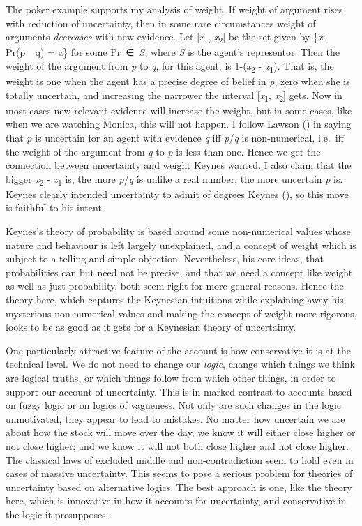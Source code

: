\documentclass[
  10pt,
  letterpaper,
  DIV=11,
  numbers=noendperiod,
  twoside]{scrartcl}
\begin{document}
The poker example supports my analysis of weight. If weight of argument
rises with reduction of uncertainty, then in some rare circumstances
weight of arguments \emph{decreases} with new evidence. Let
{[}\emph{x}\textsubscript{1}, \emph{x}\textsubscript{2}{]} be the set
given by \{\emph{x}: Pr(p\emph{~\textbar~}q) = \emph{x}\} for some
Pr~∈~\emph{S}, where \emph{S} is the agent's representor. Then the
weight of the argument from \emph{p} to \emph{q}, for this agent, is
1-(\emph{x}\textsubscript{2} - \emph{x}\textsubscript{1}). That is, the
weight is one when the agent has a precise degree of belief in \emph{p},
zero when she is totally uncertain, and increasing the narrower the
interval {[}\emph{x}\textsubscript{1}, \emph{x}\textsubscript{2}{]}
gets. Now in most cases new relevant evidence will increase the weight,
but in some cases, like when we are watching Monica, this will not
happen. I follow Lawson () in saying that
\emph{p} is uncertain for an agent with evidence \emph{q} iff
\emph{p}/\emph{q} is non-numerical, i.e.~iff the weight of the argument
from \emph{q} to \emph{p} is less than one. Hence we get the connection
between uncertainty and weight Keynes wanted. I also claim that the
bigger \emph{x}\textsubscript{2} - \emph{x}\textsubscript{1} is, the
more \emph{p}/\emph{q} is unlike a real number, the more uncertain
\emph{p} is. Keynes clearly intended uncertainty to admit of degrees
Keynes (), so this move is faithful to
his intent.

Keynes's theory of probability is based around some non-numerical values
whose nature and behaviour is left largely unexplained, and a concept of
weight which is subject to a telling and simple objection. Nevertheless,
his core ideas, that probabilities can but need not be precise, and that
we need a concept like weight as well as just probability, both seem
right for more general reasons. Hence the theory here, which captures
the Keynesian intuitions while explaining away his mysterious
non-numerical values and making the concept of weight more rigorous,
looks to be as good as it gets for a Keynesian theory of uncertainty.

One particularly attractive feature of the account is how conservative
it is at the technical level. We do not need to change our \emph{logic},
change which things we think are logical truths, or which things follow
from which other things, in order to support our account of uncertainty.
This is in marked contrast to accounts based on fuzzy logic or on logics
of vagueness. Not only are such changes in the logic unmotivated, they
appear to lead to mistakes. No matter how uncertain we are about how the
stock will move over the day, we know it will either close higher or not
close higher; and we know it will not both close higher and not close
higher. The classical laws of excluded middle and non-contradiction seem
to hold even in cases of massive uncertainty. This seems to pose a
serious problem for theories of uncertainty based on alternative logics.
The best approach is one, like the theory here, which is innovative in
how it accounts for uncertainty, and conservative in the logic it
presupposes.
\end{document}
